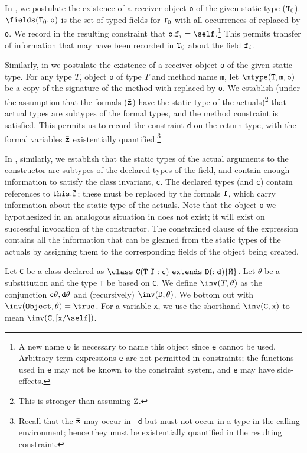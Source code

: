 In \TField, we postulate the existence of a receiver object {\tt o} of
the given static type (${\tt T}_0$). $\fields({\tt T}_0,{\tt o})$ is
the set of typed fields for ${\tt T}_0$ with all occurrences of 
\this{} replaced  by {\tt o}. We record in the resulting
constraint that ${\tt o.f}_i=\self$.\footnote{A new name {\tt o} is
necessary to name this object since {\tt e} cannot be used. Arbitrary
term expressions {\tt e} are not permitted in constraints; the
functions used in {\tt e} may not be known to the constraint system,
and {\tt e} may have side-effects.}  This permits transfer of
information that may have been recorded in ${\tt T}_0$ about the field
${\tt f}_i$. 

Similarly, in \TInvk{} we postulate the existence of a receiver object
{\tt o} of the given static type. For any type $T$, object {\tt o} of
type $T$ and method name {\tt m}, let $\mtype({\tt T},{\tt m},{\tt
o})$ be a copy of the signature of the method with \this{} replaced by
{\tt o}. We establish (under the assumption that the formals
($\bar{\tt z}$) have the static type of the actuals)\footnote{This is
stronger than assuming $\bar{\tt Z}$.}  that actual types are subtypes
of the formal types, and the method constraint is satisfied. This
permits us to record the constraint {\tt d} on the return type, with
the formal variables $\bar{\tt z}$ existentially
quantified.\footnote{Recall that the $\bar{\tt z}$ may occur in {\tt
d} but must not occur in a type in the calling environment; hence they
must be existentially quantified in the resulting constraint.}

In \TNew, similarly, we establish that the static types of the actual
arguments to the constructor are subtypes of the declared types of the
field, and contain enough information to satisfy the class invariant,
{\tt c}. The declared types (and {\tt c}) contain references to ${\tt
this.\bar{\tt f}}$; these must be replaced by the formals $\bar{\tt
f}$, which carry information about the static type of the
actuals. Note that the object {\tt o} we hypothesized in an analogous
situation in \TInvk{} does not exist; it will exist on successful
invocation of the constructor. The constrained clause of the \new{}
expression contains all the information that can be gleaned from the
static types of the actuals by assigning them to the corresponding
fields of the object being created.

Let {\tt C} be a class declared as ${\tt \class\ C(\bar{\tt T}\
\bar{\tt f}:c)\ extends\ D(:d)\{\bar{\tt M}\}}$. Let
$\theta$ be a substitution and the type {\tt T} be based on {\tt C}.
We define $\inv(T,\theta)$
as the conjunction ${\tt c\theta,d\theta}$ and (recursively)
$\inv({\tt D},\theta)$.  We bottom out with $\inv({\tt
Object},\theta)=\true$. For a variable {\tt x}, we use the shorthand
$\inv({\tt C},{\tt x})$ to mean $\inv({\tt C},[{\tt x}/\self])$.

